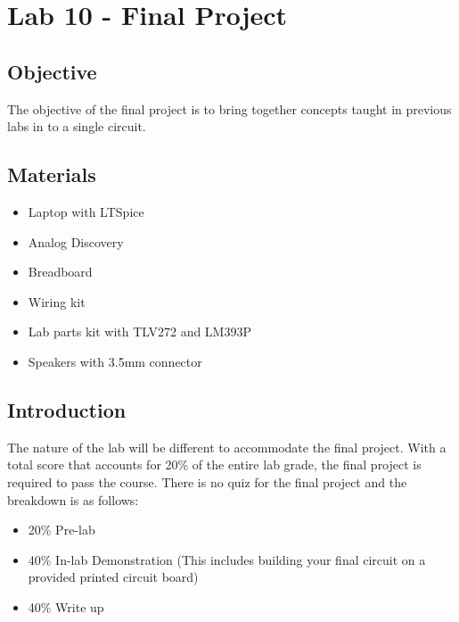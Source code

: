 \chapter{Lab 10 - Final Project}

\section{Objective}

The objective of the final project is to bring together concepts taught in previous labs in to a single circuit. 

\section{Materials}

\begin{itemize}
	\item Laptop with LTSpice
	\item Analog Discovery
	\item Breadboard
	\item Wiring kit
	\item Lab parts kit with TLV272 and LM393P
	\item Speakers with 3.5mm connector
\end{itemize}

\section{Introduction}

The nature of the lab will be different to accommodate the final project. With a total score that accounts for 20\% of the entire lab grade, the final project is required to pass the course. There is no quiz for the final project and the breakdown is as follows:

\begin{itemize}
	\item 20\% Pre-lab 
	\item 40\% In-lab Demonstration (This includes building your final circuit on a provided printed circuit board)
	\item 40\% Write up 
	
\end{itemize}

